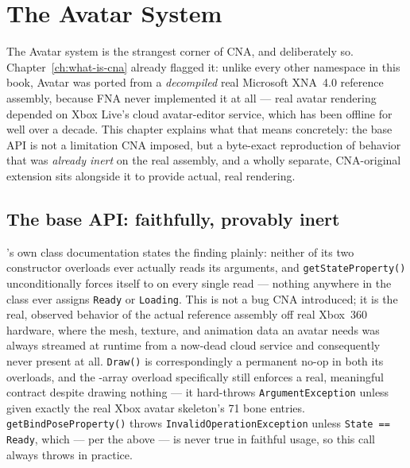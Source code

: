 \chapter{The Avatar System}
\label{ch:avatar}

The Avatar system is the strangest corner of CNA, and deliberately so. Chapter~\ref{ch:what-is-cna} already
flagged it: unlike every other namespace in this book, Avatar was ported from
a \emph{decompiled} real Microsoft XNA~4.0 reference assembly, because FNA never implemented
it at all --- real avatar rendering depended on Xbox Live's cloud avatar-editor service, which
has been offline for well over a decade. This chapter explains what that means concretely:
the base API is not a limitation CNA imposed, but a byte-exact reproduction of behavior that
was \emph{already inert} on the real assembly, and a wholly separate, CNA-original extension
sits alongside it to provide actual, real rendering.

\section{The base API: faithfully, provably inert}

's own class documentation states the finding plainly: neither of
its two constructor overloads ever actually reads its arguments, and
\texttt{getStateProperty()} unconditionally forces itself to
 on every single read --- nothing anywhere in the
class ever assigns \texttt{Ready} or \texttt{Loading}. This is not a bug CNA introduced; it is
the real, observed behavior of the actual reference assembly off real Xbox~360 hardware,
where the mesh, texture, and animation data an avatar needs was always streamed at runtime
from a now-dead cloud service and consequently never present at all. \texttt{Draw()} is
correspondingly a permanent no-op in both its overloads, and the -array
overload specifically still enforces a real, meaningful contract despite drawing nothing ---
it hard-throws \texttt{ArgumentException} unless given exactly the real Xbox avatar
skeleton's 71 bone entries. \texttt{getBindPoseProperty()} throws
\texttt{InvalidOperationException} unless \texttt{State == Ready}, which --- per the above ---
is never true in faithful usage, so this call always throws in practice.

